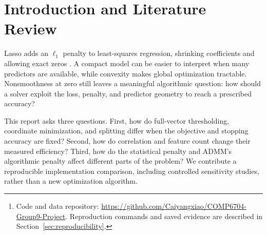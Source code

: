 \documentclass[10pt,letterpaper]{article}
\newcommand{\projectrepository}{\url{https://github.com/Caiyangxiao/COMP6704-Group9-Project}}
\begin{document}
\begin{abstract}
Lasso regression combines squared loss with an $\ell_1$ penalty to learn sparse linear models. We review its convex formulation and implement ISTA, standard FISTA, cyclic coordinate descent, and scaled ADMM. All four solve the same training problems and stop at a common proximal-gradient residual, with ADMM's factorization included in runtime. A fresh comparison uses three synthetic instances, one fixed Diabetes split, paired correlation and dimension studies, and ADMM penalty sensitivity. All @@TIMED_COUNT@@ primary timing runs converge, with nearly identical final objectives and predictions. ISTA has the lowest mean time on independent-feature designs; ADMM is fastest on the recorded Diabetes split and has the lowest mean at the three positive correlation levels. Strongly correlated FISTA runs vary substantially. ADMM's setup cost grows with feature count, and its algorithmic penalty changes convergence speed without changing the Lasso estimator. Coefficient and regularization analyses distinguish numerical accuracy, sparse selection, and shrinkage error. Conclusions remain specific to the recorded implementations, datasets, and stopping rule.\footnote{Code and data repository: \projectrepository. Reproduction commands and saved evidence are described in Section~\ref{sec:reproducibility}.}
\end{abstract}

\section{Introduction and Literature Review}
Lasso adds an $\ell_1$ penalty to least-squares regression, shrinking coefficients and allowing exact zeros \citep{tibshirani1996}. A compact model can be easier to interpret when many predictors are available, while convexity makes global optimization tractable. Nonsmoothness at zero still leaves a meaningful algorithmic question: how should a solver exploit the loss, penalty, and predictor geometry to reach a prescribed accuracy?

This report asks three questions. First, how do full-vector thresholding, coordinate minimization, and splitting differ when the objective and stopping accuracy are fixed? Second, how do correlation and feature count change their measured efficiency? Third, how do the statistical penalty and ADMM's algorithmic penalty affect different parts of the problem? We contribute a reproducible implementation comparison, including controlled sensitivity studies, rather than a new optimization algorithm.
\end{document}
